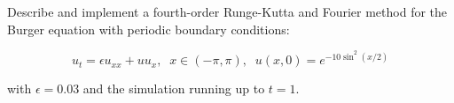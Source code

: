 Describe and implement a fourth-order Runge-Kutta and Fourier method for the Burger equation with
periodic boundary conditions:

$$u_t = \epsilon u_{xx} + uu_x,\;\;x\in(-\pi,\pi),\;\;u(x,0) = e^{-10\sin^2(x/2)}$$

with $\epsilon = 0.03$ and the simulation running up to $t = 1$.

\begin{solution}\renewcommand{\qedsymbol}{}\ \\
\end{solution}

\newpage

\newpage